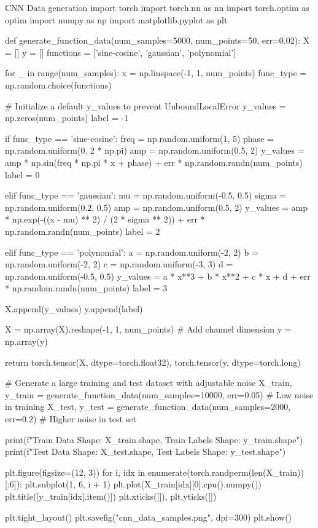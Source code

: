 \begin{codeonly}{CNN Data generation}
import torch
import torch.nn as nn
import torch.optim as optim
import numpy as np
import matplotlib.pyplot as plt

def generate_function_data(num_samples=5000, num_points=50, err=0.02):
    X = []
    y = []
    functions = ['sine-cosine', 'gaussian', 'polynomial']
    
    for _ in range(num_samples):
        x = np.linspace(-1, 1, num_points)
        func_type = np.random.choice(functions)

        # Initialize a default y_values to prevent UnboundLocalError
        y_values = np.zeros(num_points)
        label = -1

        if func_type == 'sine-cosine':
            freq = np.random.uniform(1, 5)  
            phase = np.random.uniform(0, 2 * np.pi)
            amp = np.random.uniform(0.5, 2)
            y_values = amp * np.sin(freq * np.pi * x + phase) + err * np.random.randn(num_points)
            label = 0

        elif func_type == 'gaussian':
            mu = np.random.uniform(-0.5, 0.5)  
            sigma = np.random.uniform(0.2, 0.5)  
            amp = np.random.uniform(0.5, 2)
            y_values = amp * np.exp(-((x - mu) ** 2) / (2 * sigma ** 2)) + err * np.random.randn(num_points)
            label = 2

        elif func_type == 'polynomial':
            a = np.random.uniform(-2, 2)
            b = np.random.uniform(-2, 2)
            c = np.random.uniform(-3, 3)
            d = np.random.uniform(-0.5, 0.5)
            y_values = a * x**3 + b * x**2 + c * x + d + err * np.random.randn(num_points)
            label = 3

        X.append(y_values)
        y.append(label)

    X = np.array(X).reshape(-1, 1, num_points)  # Add channel dimension
    y = np.array(y)
    
    return torch.tensor(X, dtype=torch.float32), torch.tensor(y, dtype=torch.long)

# Generate a large training and test dataset with adjustable noise
X_train, y_train = generate_function_data(num_samples=10000, err=0.05)  # Low noise in training
X_test, y_test = generate_function_data(num_samples=2000, err=0.2)  # Higher noise in test set

print(f"Train Data Shape: {X_train.shape}, Train Labels Shape: {y_train.shape}")
print(f"Test Data Shape: {X_test.shape}, Test Labels Shape: {y_test.shape}")

plt.figure(figsize=(12, 3))
for i, idx in enumerate(torch.randperm(len(X_train))[:6]):
    plt.subplot(1, 6, i + 1)
    plt.plot(X_train[idx][0].cpu().numpy())
    plt.title([y_train[idx].item()])
    plt.xticks([]), plt.yticks([])

plt.tight_layout()
plt.savefig("cnn_data_samples.png", dpi=300)
plt.show()
\end{codeonly}

